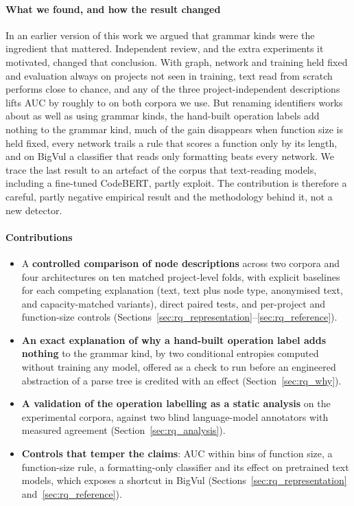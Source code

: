 \paragraph{What we found, and how the result changed} In an earlier version of
this work we argued that grammar kinds were the ingredient that mattered.
Independent review, and the extra experiments it motivated, changed that
conclusion. With graph, network and training held fixed and evaluation always
on projects not seen in training, text read from scratch performs close to
chance, and any of the three project-independent descriptions lifts AUC by
roughly \numdeltaMin{} to \numdeltaMax{} on both corpora we use. But renaming identifiers works
about as well as using grammar kinds, the hand-built operation labels add
nothing to the grammar kind, much of the gain disappears when function size is
held fixed, every network trails a rule that scores a function only by its
length, and on BigVul a classifier that reads only formatting beats every
network. We trace the last result to an artefact of the corpus that
text-reading models, including a fine-tuned CodeBERT, partly exploit.
The contribution is therefore a careful, partly negative empirical result and
the methodology behind it, not a new detector.

\paragraph{Contributions}
\begin{itemize}
    \item A \textbf{controlled comparison of node descriptions} across two
          corpora and four architectures on ten matched project-level folds,
          with explicit baselines for each competing explanation (text, text
          plus node type, anonymised text, and capacity-matched variants),
          direct paired tests, and per-project and function-size controls
          (Sections~\ref{sec:rq_representation}--\ref{sec:rq_reference}).
    \item \textbf{An exact explanation of why a hand-built operation label adds
          nothing} to the grammar kind, by two conditional entropies computed
          without training any model, offered as a check to run before an
          engineered abstraction of a parse tree is credited with an effect
          (Section~\ref{sec:rq_why}).
    \item \textbf{A validation of the operation labelling as a static analysis}
          on the experimental corpora, against two blind language-model
          annotators with measured agreement (Section~\ref{sec:rq_analysis}).
    \item \textbf{Controls that temper the claims}: AUC within bins of function
          size, a function-size rule, a formatting-only classifier and its effect
          on pretrained text models, which exposes a shortcut in BigVul
          (Sections~\ref{sec:rq_representation}
          and~\ref{sec:rq_reference}).
\end{itemize}

